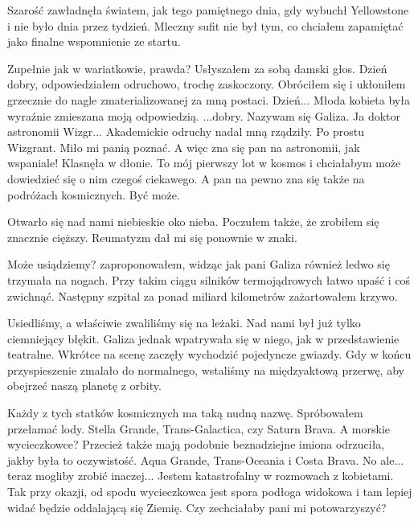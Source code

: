Szarość zawładnęła światem, jak tego pamiętnego dnia, gdy wybuchł Yellowstone i nie było dnia przez tydzień.
Mleczny sufit nie był tym, co chciałem zapamiętać jako finalne wspomnienie ze startu.

\begin{dialogue}
	\ds{} Zupełnie jak w wariatkowie, prawda? \dm{} Usłyszałem za sobą damski głos.
	\ds{} Dzień dobry,  \dm{} odpowiedziałem odruchowo, trochę zaskoczony. Obróciłem się i ukłoniłem grzecznie do nagle zmaterializowanej za mną postaci.
	\ds{} Dzień... \dm{} Młoda kobieta była wyraźnie zmieszana moją odpowiedzią. \dm{} ...dobry. Nazywam się Galiza.
	\ds{} Ja doktor astronomii Wizgr... \dm{} Akademickie odruchy nadal mną rządziły. \dm{} Po prostu Wizgrant. Miło mi panią poznać.
	\ds{} A więc zna się pan na astronomii, jak wspaniale! \dm{} Klasnęła w dłonie. \dm{} To mój pierwszy lot w kosmos i chciałabym może dowiedzieć się o nim czegoś ciekawego.
		A pan na pewno zna się także na podróżach kosmicznych.
	\ds{} Być może.
\end{dialogue}

Otwarło się nad nami niebieskie oko nieba.
Poczułem także, że zrobiłem się znacznie cięższy.
Reumatyzm dał mi się ponownie w znaki.

\begin{dialogue}
	\ds{} Może usiądziemy? \dm{} zaproponowałem, widząc jak pani Galiza również ledwo się trzymała na nogach. \dm{} Przy takim ciągu silników termojądrowych łatwo upaść i coś zwichnąć. Następny szpital za ponad miliard kilometrów \dm{} zażartowałem krzywo.
\end{dialogue}

Usiedliśmy, a właściwie zwaliliśmy się na leżaki.
Nad nami był już tylko ciemniejący błękit.
Galiza jednak wpatrywała się w niego, jak w przedstawienie teatralne.
Wkrótce na scenę zaczęły wychodzić pojedyncze gwiazdy.
Gdy w końcu przyspieszenie zmalało do normalnego, wstaliśmy na międzyaktową przerwę, aby obejrzeć naszą planetę z orbity.

\begin{dialogue}
	\ds{} Każdy z tych statków kosmicznych ma taką nudną nazwę. \dm{} Spróbowałem przełamać lody. \dm{} Stella Grande, Trans-Galactica, czy Saturn Brava. 
	\ds{} A morskie wycieczkowce?  Przecież także mają podobnie beznadziejne imiona \dm{} odrzuciła, jakby była to oczywistość. \dm{} Aqua Grande, Trans-Oceania i Costa Brava.
	\ds{} No ale... teraz mogliby zrobić inaczej... \dm{} Jestem katastrofalny w rozmowach z kobietami. \dm{} 
			Tak przy okazji, od spodu wycieczkowca jest spora podłoga widokowa i tam lepiej widać będzie oddalającą się Ziemię. Czy zechciałaby pani mi potowarzyszyć?
\end{dialogue}

